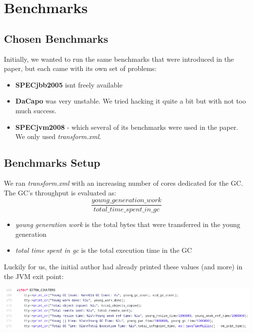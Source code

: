 \documentclass{article}
\begin{document}
 \newpage

 \section{Benchmarks}
 \subsection{Chosen Benchmarks}
 Initially, we wanted to run the same benchmarks that were introduced in the paper, but each came with its own set of problems:

 \begin{itemize}
   \item \textbf{SPECjbb2005} isnt freely available
   \item \textbf{DaCapo} was very unstable. We tried hacking it quite a bit but with not too much success.
   \item \textbf{SPECjvm2008} - which several of its benchmarks were used in the paper. We only used \textit{transform.xml}.
 \end{itemize}

 \subsection{Benchmarks Setup}
 We ran \textit{transform.xml} with an increasing number of cores dedicated for the GC.
 The GC's throughput is evaluated as:
 \begin{equation}
	 \frac{young\_generation\_work}{total\_time\_spent\_in\_gc}
 \end{equation}

 \begin{itemize}
   \item \textit{young generation work} is the total bytes that were transferred in the young generation
   \item \textit{total time spent in gc} is the total execution time in the GC
 \end{itemize}

 Luckily for us, the initial author had already printed these values (and more) in the JVM exit point:

 \includegraphics[width=\textwidth]{gc-debug-prints.png}
\end{document}
